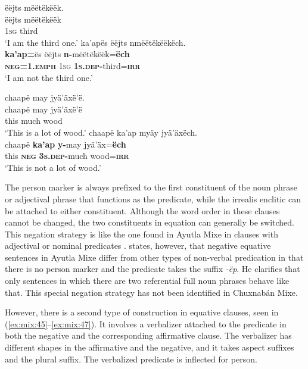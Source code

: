 \documentclass[output=paper,colorlinks,citecolor=brown,draft]{langscibook}
\begin{document}
\ea\label{ex:mix:43}
    \ea\label{ex:mix:43a}
        \glll ëëjts mëëtëkëëk.\\ 
              ëëjts mëëtëkëëk\\
              \textsc{1sg} third\\
        \glt ‘I am the third one.’
    \ex\label{ex:mix:43b}
        \glll ka’apës ëëjts nmëëtëkëëkëch.\\
             \textbf{ka’ap=}ës ëëjts \textbf{n-}mëëtëkëëk=\textbf{ëch}\\
             \textbf{\textsc{neg=1.emph}} \textsc{1sg} \textbf{\textsc{1s.dep}}\textbf{{}-}third=\textbf{\textsc{irr}}\\
        \glt ‘I am not the third one.’
    \z
\z 
 
\ea\label{ex:mix:44}
    \ea\label{ex:mix:44a}
        \glll  chaapë may jyä’äxë’ë.\\ 
              chaapë may jyä’äxë’ë\\
              this much wood\\
        \glt ‘This is a lot of wood.’
    \ex\label{ex:mix:44b}
        \glll chaapë ka’ap myäy jyä’äxëch. \\
             chaapë \textbf{ka’ap} \textbf{y-}may jyä’äx=\textbf{ëch}\\
             this \textbf{\textsc{neg}} \textbf{\textsc{3s.dep}}\textbf{{}-}much wood=\textbf{\textsc{irr}} \\
        \glt ‘This is not a lot of wood.’
    \z
\z 

The person marker is always prefixed to the first constituent of the noun phrase or adjectival phrase that functions as the predicate, while the irrealis enclitic can be attached to either constituent. Although the word order in these clauses cannot be changed, the two constituents in equation can generally be switched. This negation strategy is like the one found in Ayutla Mixe in clauses with adjectival or nominal predicates \citep[408]{Romero-Méndez2009}. \citet[418]{Romero-Méndez2009} states, however, that negative equative sentences in Ayutla Mixe differ from other types of non-verbal predication in that there is no person marker and the predicate takes the suffix \textit{{}-ëp}. He clarifies that only sentences in which there are two referential full noun phrases behave like that. This special negation strategy has not been identified in Chuxnabán Mixe.

However, there is a second type of construction in equative clauses, seen in (\ref{ex:mix:45}--\ref{ex:mix:47}). It involves a verbalizer attached to the predicate in both the negative and the corresponding affirmative clause. The verbalizer has different shapes in the affirmative and the negative, and it takes aspect suffixes and the plural suffix. The verbalized predicate is inflected for person. 
\end{document}

